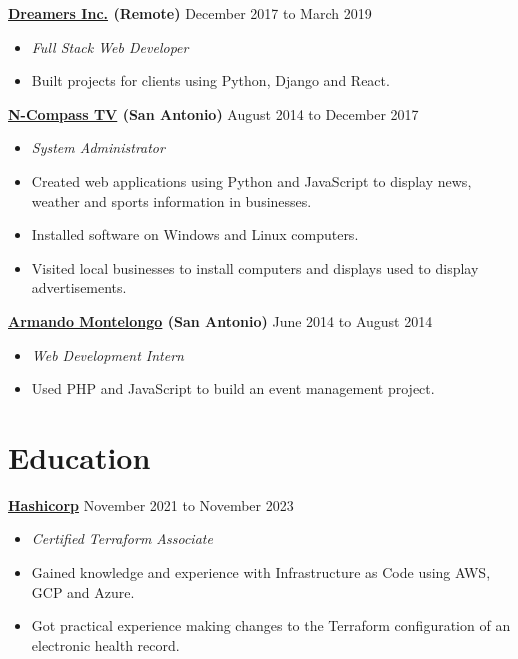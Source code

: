 \documentclass[10pt]{article}
\begin{document}
  \textbf{\href{https://thedreamers.us/}{Dreamers Inc.} (Remote)} \hfill {December 2017 to March 2019}
    \begin{itemize}
     \item[] \textit{Full Stack Web Developer}
     \item[] Built projects for clients using Python, Django and React.
    \end{itemize}

   \textbf{\href{https://n-compass.tv/}{N-Compass TV} (San Antonio)} \hfill {August 2014 to December 2017}
    \begin{itemize}
        \item[] \textit{System Administrator}
        \item[] Created web applications using Python and JavaScript to display news, weather and sports information in businesses.
        \item[] Installed software on Windows and Linux computers.
        \item[] Visited local businesses to install computers and displays used to display advertisements.
    \end{itemize}

   \textbf{\href{https://armandomontelongo.com/}{Armando Montelongo} (San Antonio)} \hfill {June 2014 to August 2014}
    \begin{itemize}
     \item[] \textit{Web Development Intern}
     \item[] Used PHP and JavaScript to build an event management project.
    \end{itemize}

   \section*{Education}
   \noindent

  \textbf{\href{https://www.credly.com/badges/d4012af6-1c9f-4ca8-aa2a-931c2c3c8e5b}{Hashicorp}} \hfill {November 2021 to November 2023}
   \begin{itemize}
     \item[] \textit{Certified Terraform Associate}
     \item[] Gained knowledge and experience with Infrastructure as Code using AWS, GCP and Azure.
     \item[] Got practical experience making changes to the Terraform configuration of an electronic health record.
    \end{itemize}
\end{document}
